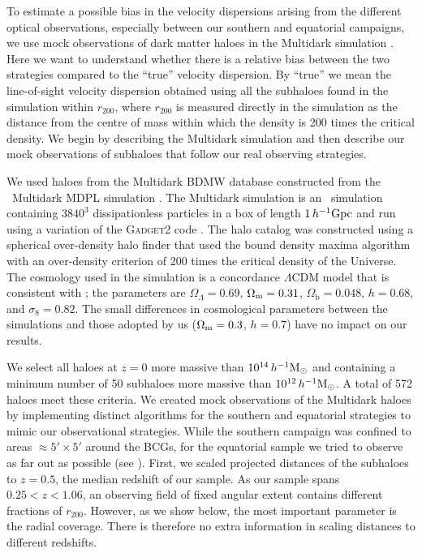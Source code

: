 To estimate a possible bias in the velocity dispersions arising from the different optical observations, especially between our southern and equatorial campaigns, we use mock observations of dark matter haloes in the Multidark simulation \citep{prada12}. Here we want to understand whether there is a relative bias between the two strategies compared to the ``true'' velocity dispersion. By ``true'' we mean the line-of-sight velocity dispersion obtained using all the subhaloes found in the simulation within $r_{200}$, where $r_{200}$ is measured directly in the simulation as the distance from the centre of mass within which the density is 200 times the critical density. We begin by describing the Multidark simulation and then describe our mock observations of subhaloes that follow our real observing strategies.

We used haloes from the Multidark BDMW database \citep{riebe13} constructed from the \Nbody\ 
Multidark MDPL simulation \citep{prada12}. The Multidark simulation is an \Nbody\ simulation 
containing $3840^3$ dissipationless particles in a box of length $1\,h^{-1}{\rm Gpc}$ and run 
using a variation of the \textsc{Gadget2} code \citep{springel05_gadget}. The halo catalog was 
constructed using a spherical over-density halo finder that used the bound density maxima 
algorithm \citep[BDM,][]{klypin97} with an over-density criterion of 200 times the critical 
density of the Universe. The cosmology used in the simulation is a concordance $\Lambda$CDM model 
that is consistent with \cite{planck13xvi}; the parameters are $\Omega_\Lambda=0.69$, $\Omega_{\rm 
m}=0.31$, $\Omega_\mathrm{b}=0.048$, $h=0.68$, and $\sigma_8=0.82$. The small differences in 
cosmological parameters between the simulations and those adopted by us ($\Omega_{\rm m}=0.3$, 
$h=0.7$) have no impact on our results.

We select all haloes at $z=0$ more massive than $10^{14}\,h^{-1}{\rm M}_\odot$ and containing a minimum 
number of 50 subhaloes more massive than $10^{12}\,h^{-1}{\rm M}_\odot$. A total of 572 haloes meet these 
criteria. We created mock observations of the Multidark haloes by implementing distinct algorithms 
for the southern and equatorial strategies to mimic our observational strategies. While the 
southern campaign was confined to areas $\approx\!5'\times5'$ around the BCGs, for the 
equatorial sample we tried to observe as far out as possible (see \Cref{s:spectroscopy}). First, 
we scaled projected distances of the subhaloes to $z=0.5$, the median redshift of our sample.
As our sample spans $0.25<z<1.06$, an observing field of fixed angular extent contains different 
fractions of $r_{200}$. However, as we show below, the most important parameter is the radial 
coverage. There is therefore no extra information in scaling distances to different redshifts.

